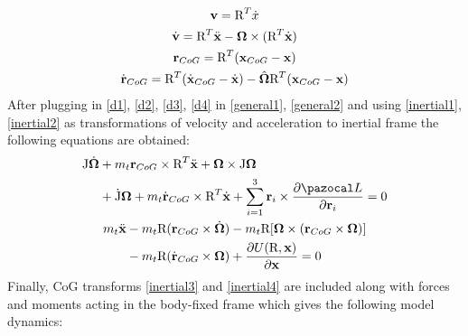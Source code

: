 \begin{gather}
	\textbf{v} = \text{R}^T \dot{x} \label{inertial1}\\
	\dot{\textbf{v}} = \text{R}^T \ddot{\textbf{x}} - \boldsymbol{\Omega} \times (\text{R}^T \dot{\textbf{x}} ) \label{inertial2} \\
	\textbf{r}_{CoG} = \text{R}^T(\textbf{x}_{CoG} - \textbf{x}) \label{inertial3} \\
	\dot{\textbf{r}}_{CoG} = \text{R}^T(\dot{\textbf{x}}_{CoG} - \dot{\textbf{x}}) - \hat{\boldsymbol{\Omega}}\text{R}^T(\textbf{x}_{CoG} - \textbf{x}) \label{inertial4}
\end{gather}
After plugging in \ref{d1}, \ref{d2}, \ref{d3}, \ref{d4} in \ref{general1}, \ref{general2} and using \ref{inertial1}, \ref{inertial2} as transformations of velocity and acceleration to inertial frame the following equations are obtained:
\begin{gather}
\label{complete_model1}
\begin{align}
	\begin{split}
		\text{J}\dot{\mb{\Omega}} &+ m_t \textbf{r}_{CoG} \times \text{R}^T \ddot{\textbf{x}} + \mb{\Omega} \times \text{J}\mb{\Omega} \\
		&+ \dot{\text{J}} \mb{\Omega} + m_t \dot{\textbf{r}}_{CoG} \times \text{R}^T \dot{\textbf{x}} + \sum_{i=1}^{3} \textbf{r}_i \times \frac{\partial \La}{\partial \textbf{r}_i} = 0
	\end{split}
\end{align} \\
\label{complete_model2}
\begin{align}
	\begin{split}
		m_t \ddot{\textbf{x}} & - m_t \text{R}(\textbf{r}_{CoG} \times \dot{\mb{\Omega}}) - m_t \text{R}[\mb{\Omega} \times (\textbf{r}_{CoG} \times \mb{\Omega})] \\
		&- m_t \text{R}(\dot{\textbf{r}}_{CoG} \times \mb{\Omega}) + \frac{\partial U(\text{R},\textbf{x})}{\partial \textbf{x}} = 0
	\end{split}
\end{align}
\end{gather}
Finally, CoG transforms \ref{inertial3} and \ref{inertial4} are included along with forces and moments acting in the body-fixed frame which gives the following model dynamics:

